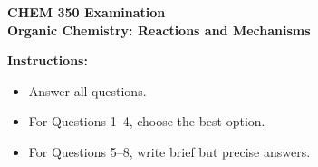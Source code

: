 \documentclass[11pt]{article}
\begin{document}
\begin{center}
  {\Large \textbf{CHEM 350 Examination}}\\[0.25em]
  {\large \textbf{Organic Chemistry: Reactions and Mechanisms}}\\[0.5em]
\end{center}

\noindent\textbf{Instructions:}
\begin{itemize}
  \item Answer all questions.
  \item For Questions 1--4, choose the best option.
  \item For Questions 5--8, write brief but precise answers.
\end{itemize}

\vspace{0.5em}
\end{document}

